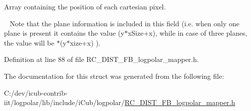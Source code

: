 Array containing the position of each cartesian pixel. 

~\newline
 Note that the plane information is included in this field (i.\+e. when only one plane is present it contains the value ({\ttfamily y$\ast$x\+Size+x}), while in case of three planes, the value will be {$\ast$}({\ttfamily y$\ast$xize+x}) ). 

Definition at line 88 of file R\+C\+\_\+\+D\+I\+S\+T\+\_\+\+F\+B\+\_\+logpolar\+\_\+mapper.\+h.



The documentation for this struct was generated from the following file\+:\begin{DoxyCompactItemize}
\item 
C\+:/dev/icub-\/contrib-\/iit/logpolar/lib/include/i\+Cub/logpolar/\hyperlink{RC__DIST__FB__logpolar__mapper_8h}{R\+C\+\_\+\+D\+I\+S\+T\+\_\+\+F\+B\+\_\+logpolar\+\_\+mapper.\+h}\end{DoxyCompactItemize}

